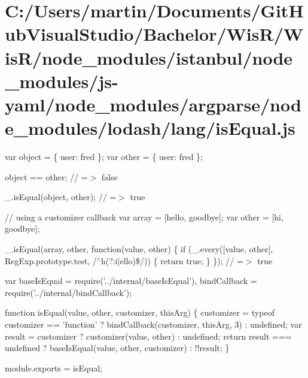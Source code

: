 \hypertarget{_c_1_2_users_2martin_2_documents_2_git_hub_visual_studio_2_bachelor_2_wis_r_2_wis_r_2node_module138f7216aea26d7b458aa968f5ca14f5}{}\section{C\+:/\+Users/martin/\+Documents/\+Git\+Hub\+Visual\+Studio/\+Bachelor/\+Wis\+R/\+Wis\+R/node\+\_\+modules/istanbul/node\+\_\+modules/js-\/yaml/node\+\_\+modules/argparse/node\+\_\+modules/lodash/lang/is\+Equal.\+js}
var object = \{ \textquotesingle{}user\textquotesingle{}\+: \textquotesingle{}fred\textquotesingle{} \}; var other = \{ \textquotesingle{}user\textquotesingle{}\+: \textquotesingle{}fred\textquotesingle{} \};

object == other; // =$>$ false

\+\_\+.\+is\+Equal(object, other); // =$>$ true

// using a customizer callback var array = \mbox{[}\textquotesingle{}hello\textquotesingle{}, \textquotesingle{}goodbye\textquotesingle{}\mbox{]}; var other = \mbox{[}\textquotesingle{}hi\textquotesingle{}, \textquotesingle{}goodbye\textquotesingle{}\mbox{]};

\+\_\+.\+is\+Equal(array, other, function(value, other) \{ if (\+\_\+.\+every(\mbox{[}value, other\mbox{]}, Reg\+Exp.\+prototype.\+test, /$^\wedge$h(?\+:i$\vert$ello)\$/)) \{ return true; \} \}); // =$>$ true


\begin{DoxyCodeInclude}
var baseIsEqual = require(\textcolor{stringliteral}{'../internal/baseIsEqual'}),
    bindCallback = require(\textcolor{stringliteral}{'../internal/bindCallback'});

\textcolor{keyword}{function} isEqual(value, other, customizer, thisArg) \{
  customizer = typeof customizer == \textcolor{stringliteral}{'function'} ? bindCallback(customizer, thisArg, 3) : undefined;
  var result = customizer ? customizer(value, other) : undefined;
  \textcolor{keywordflow}{return}  result === undefined ? baseIsEqual(value, other, customizer) : !!result;
\}

module.exports = isEqual;
\end{DoxyCodeInclude}
 
